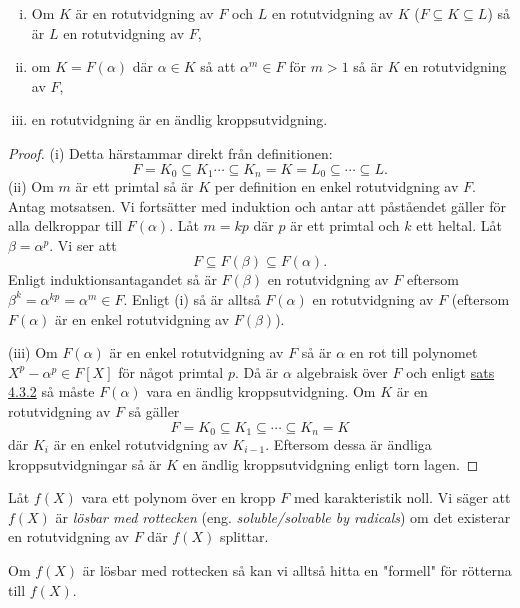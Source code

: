 \documentclass{article}
\theoremstyle{definition}
\begin{document}
\hypertarget{lemma10.0.1}{}
\begin{mylemma}{}{}
  \begin{enumerate}[(i)]
    \item Om $K$ är en rotutvidgning av $F$ och $L$ en rotutvidgning av $K$ ($F \subseteq K \subseteq L$) så är $L$ en rotutvidgning av $F$,
    \item om $K = F(\alpha)$ där $\alpha \in K$ så att $\alpha^m \in F$ för $m > 1$ så är $K$ en rotutvidgning av $F$,
    \item en rotutvidgning är en ändlig kroppsutvidgning.
  \end{enumerate}
\end{mylemma}
\begin{proof}
  (i) Detta härstammar direkt från definitionen:
  \[F = K_0 \subseteq K_1 \cdots \subseteq K_n = K = L_0 \subseteq \cdots \subseteq L.\]
  (ii) Om $m$ är ett primtal så är $K$ per definition en enkel rotutvidgning av $F$. Antag motsatsen. 
  Vi fortsätter med induktion och antar att påståendet gäller för alla delkroppar till $F(\alpha)$. Låt $m = kp$ där $p$ är ett primtal 
  och $k$ ett heltal. Låt $\beta = \alpha^p$. Vi ser att 
  \[F \subseteq F(\beta) \subseteq F(\alpha).\]
  Enligt induktionsantagandet så är $F(\beta)$ en rotutvidgning av $F$ eftersom $\beta^k = \alpha^{kp} = \alpha^m \in F$. Enligt (i) så är 
  alltså $F(\alpha)$ en rotutvidgning av $F$ (eftersom $F(\alpha)$ är en enkel rotutvidgning av $F(\beta)$).
  
  (iii) Om $F(\alpha)$ är en enkel rotutvidgning av $F$ så är $\alpha$ en rot till polynomet $X^p - \alpha^p \in F[X]$ för något primtal $p$. 
  Då är $\alpha$ algebraisk över $F$ och enligt \hyperlink{5.3.2}{sats 4.3.2} så måste $F(\alpha)$ vara en ändlig kroppsutvidgning. Om 
  $K$ är en rotutvidgning av $F$ så gäller 
  \[F = K_0 \subseteq K_1 \subseteq \cdots \subseteq K_n = K\]
  där $K_i$ är en enkel rotutvidgning av $K_{i-1}$. Eftersom dessa är ändliga kroppsutvidgningar så är $K$ en ändlig kroppsutvidgning 
  enligt torn lagen. 
\end{proof}

\begin{mydef}{}{}
  Låt $f(X)$ vara ett polynom över en kropp $F$ med karakteristik noll. Vi säger att $f(X)$ är \textit{lösbar med rottecken} 
  (eng. \textit{soluble/solvable by radicals}) om det existerar 
  en rotutvidgning av $F$ där $f(X)$ splittar. 
\end{mydef}
Om $f(X)$ är lösbar med rottecken så kan vi alltså hitta en "formell" för rötterna till $f(X)$. 
\end{document}
